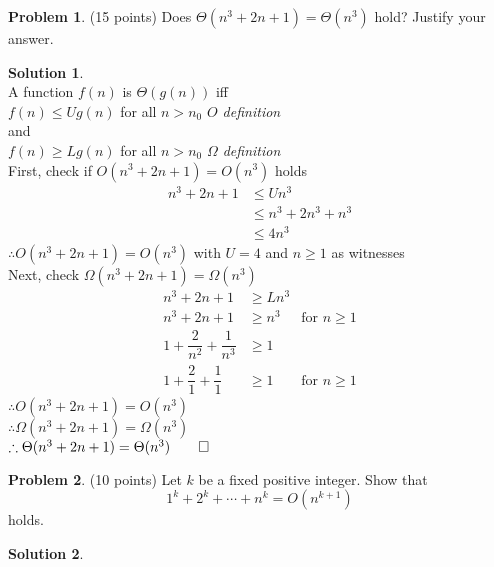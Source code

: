 \documentclass{article}
\theoremstyle{definition}
\newtheorem{problem}{Problem}
\newtheorem*{solution}{Solution}
\begin{document}
\begin{problem} (15 points) 
Does $\Theta(n^3+2n+1) = \Theta(n^3)$ hold?  Justify your answer.
\end{problem}
\begin{solution}\ \\
A function $f(n)$ is $\Theta(g(n))$ iff \\ 
\hspace{10pt} $f(n) \le U g(n)$ for all $n>n_0$ \textit{$O$ definition} \\
and\\
\hspace{10pt} $f(n) \ge L g(n)$ for all $n>n_0$ \textit{$\Omega$ definition} \\
First, check if $O(n^3+2n+1) = O(n^3)$ holds
\begin{align*}
    n^3+2n+1 &\le U n^3 \\
    &\le n^3 + 2 n^3 + n^3\\
    &\le 4n^3
\end{align*}
$\therefore O(n^3+2n+1) = O(n^3)$ with $U=4$ and $n \ge 1$ as witnesses \\
Next, check $\Omega(n^3+2n+1) = \Omega(n^3)$
\begin{align*}
    n^3+2n+1 &\ge L n^3 \\
    n^3+2n+1 &\ge n^3 &\text{for $n \ge 1$}\\
    1 + \dfrac{2}{n^2} + \dfrac{1}{n^3} &\ge 1\\
    1 + \dfrac{2}{1} + \dfrac{1}{1} &\ge 1&\text{for $n \ge 1$}
\end{align*}
$\therefore O(n^3+2n+1) = O(n^3)$ \\
$\therefore \Omega(n^3+2n+1) = \Omega(n^3)$\\
$\therefore \Theta(n^3+2n+1) = \Theta(n^3) \qed$
\end{solution}

\begin{problem} (10 points)
Let $k$ be a fixed positive integer. Show that 
$$ 1^k+2^k+\cdots + n^k  = O(n^{k+1}) $$ holds.
\end{problem}
\begin{solution}
\end{solution}
\end{document}
